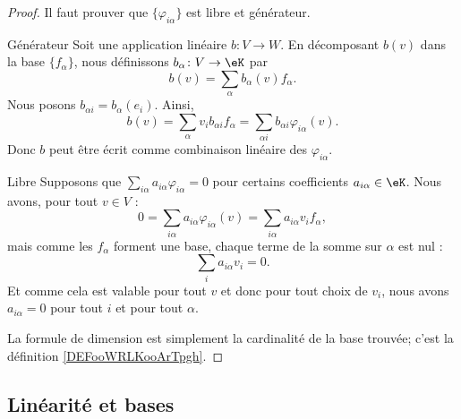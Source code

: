 \begin{proof}
    Il faut prouver que \( \{\varphi_{i\alpha}\}\) est libre et générateur.

    \begin{subproof}
        \item[Générateur]
            Soit une application linéaire \( b\colon V\to W\). En décomposant \( b(v)\) dans la base \( \{f_{\alpha}\}\), nous définissons \( b_{\alpha}\colon V\to \eK\) par
            \begin{equation}
                b(v)=\sum_{\alpha}b_{\alpha}(v)f_{\alpha}.
            \end{equation}
            Nous posons \( b_{\alpha i}=b_{\alpha}(e_i)\). Ainsi,
            \begin{equation}
                b(v)=\sum_{\alpha}v_ib_{\alpha i}f_{\alpha}=\sum_{\alpha i}b_{\alpha i}\varphi_{i\alpha}(v).
            \end{equation}
            Donc \( b\) peut être écrit comme combinaison linéaire des \( \varphi_{i\alpha}\).

        \item[Libre]
            Supposons que \( \sum_{i\alpha}a_{i\alpha}\varphi_{i\alpha}=0\) pour certains coefficients \( a_{i\alpha}\in \eK\). Nous avons, pour tout \( v\in V\) :
            \begin{equation}
                0=\sum_{i\alpha}a_{i\alpha}\varphi_{i\alpha}(v)=\sum_{i\alpha}a_{i\alpha}v_if_{\alpha},
            \end{equation}
            mais comme les \( f_{\alpha}\) forment une base, chaque terme de la somme sur \( \alpha\) est nul :
            \begin{equation}
                \sum_ia_{i\alpha}v_i=0.
            \end{equation}
            Et comme cela est valable pour tout \( v\) et donc pour tout choix de \( v_i\), nous avons \( a_{i\alpha}=0\) pour tout \( i\) et pour tout \( \alpha\).
    \end{subproof}
    La formule de dimension est simplement la cardinalité de la base trouvée; c'est la définition \ref{DEFooWRLKooArTpgh}.
\end{proof}

\subsection{Linéarité et bases}

